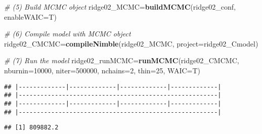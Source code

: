 \documentclass[]{article}
\newenvironment{Shaded}{\begin{snugshade}}{\end{snugshade}}
\newcommand{\CommentTok}[1]{\textcolor[rgb]{0.56,0.35,0.01}{\textit{#1}}}
\newcommand{\DataTypeTok}[1]{\textcolor[rgb]{0.13,0.29,0.53}{#1}}
\newcommand{\DecValTok}[1]{\textcolor[rgb]{0.00,0.00,0.81}{#1}}
\newcommand{\KeywordTok}[1]{\textcolor[rgb]{0.13,0.29,0.53}{\textbf{#1}}}
\newcommand{\NormalTok}[1]{#1}
\newcommand{\OperatorTok}[1]{\textcolor[rgb]{0.81,0.36,0.00}{\textbf{#1}}}
\begin{document}
\begin{Shaded}
\begin{Highlighting}[]
\CommentTok{# (5) Build MCMC object}
\NormalTok{ridge02_MCMC=}\KeywordTok{buildMCMC}\NormalTok{(ridge02_conf, }\DataTypeTok{enableWAIC=}\NormalTok{T)}

\CommentTok{# (6) Compile model with MCMC object}
\NormalTok{ridge02_CMCMC=}\KeywordTok{compileNimble}\NormalTok{(ridge02_MCMC, }\DataTypeTok{project=}\NormalTok{ridge02_Cmodel)}

\CommentTok{# (7) Run the model}
\NormalTok{ridge02_runMCMC=}\KeywordTok{runMCMC}\NormalTok{(ridge02_CMCMC, }\DataTypeTok{nburnin=}\DecValTok{10000}\NormalTok{, }\DataTypeTok{niter=}\DecValTok{500000}\NormalTok{, }\DataTypeTok{nchains=}\DecValTok{2}\NormalTok{, }\DataTypeTok{thin=}\DecValTok{25}\NormalTok{, }\DataTypeTok{WAIC=}\NormalTok{T)}
\end{Highlighting}
\end{Shaded}

\begin{verbatim}
## |-------------|-------------|-------------|-------------|
## |-------------------------------------------------------|
## |-------------|-------------|-------------|-------------|
## |-------------------------------------------------------|
\end{verbatim}

\begin{Shaded}
\end{Shaded}

\begin{verbatim}
## [1] 809882.2
\end{verbatim}
\end{document}
